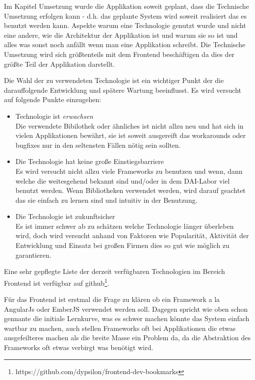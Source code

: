 \documentclass[12pt,twoside]{book}
\begin{document}
Im Kapitel Umsetzung wurde die Applikation soweit geplant, dass die Technische Umsetzung erfolgen kann - d.h. das geplante System wird soweit realisiert das es benutzt werden kann. Aspekte warum eine Technologie genutzt wurde und nicht eine andere, wie die Architektur der Applikation ist und warum sie so ist und alles was sonst noch anfällt wenn man eine Applikation schreibt.
Die Technische Umsetzung wird sich größtenteils mit dem Frontend beschäftigen da dies der größte Teil der Applikation darstellt.

Die Wahl der zu verwendeten Technologie ist ein wichtiger Punkt der die darauffolgende Entwicklung und spätere Wartung beeinflusst. Es wird versucht auf folgende Punkte einzugehen:

\begin{itemize}
  \item Technologie ist \textit{erwachsen} \\
  Die verwendete Bibilothek oder ähnliches ist nicht allzu neu und hat sich in vielen Applikationen bewährt, sie ist soweit ausgereift das workarounds oder bugfixes nur in den seltensten Fällen nötig sein sollten.
  \item Die Technologie hat keine große Einstiegsbarriere \\
  Es wird versucht nicht allzu viele Frameworks zu benutzen und wenn, dann welche die weitesgehend bekannt sind und/oder in dem DAI-Labor viel benutzt werden. Wenn Bibliotheken verwendet werden, wird darauf geachtet das sie einfach zu lernen sind und intuitiv in der Benutzung.
  \item Die Technologie ist zukunftsicher \\
  Es ist immer schwer ab zu schätzen welche Technologie länger überleben wird, doch wird versucht anhand von Faktoren wie Popularität, Aktivität der Entwicklung und Einsatz bei großen Firmen dies so gut wie möglich zu garantieren.
\end{itemize}

Eine sehr gepflegte Liste der derzeit verfügbaren Technologien im Bereich Frontend ist verfügbar auf github\footnote{https://github.com/dypsilon/frontend-dev-bookmarks}.

Für das Frontend ist erstmal die Frage zu klären ob ein Framework a la AngularJs oder EmberJS verwendet werden soll. Dagegen spricht wie oben schon gennante die initiale Lernkurve, was es schwer machen könnte das System einfach wartbar zu machen, auch stellen Frameworks oft bei Applikationen die etwas ausgefeilteres machen als die breite Masse ein Problem da, da die Abstraktion des Frameworks oft etwas verbirgt was benötigt wird.
\end{document}
